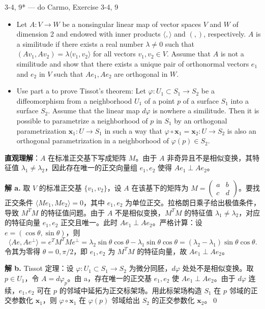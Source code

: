 \begin{exercise}{3-4, 9* — do Carmo, Exercise 3-4, 9}
\begin{itemize}
\item[a.] Let $A \colon V \to W$ be a nonsingular linear map of vector spaces $V$ and $W$ of dimension 2 and endowed with inner products $\langle , \rangle$ and $(, )$, respectively. $A$ is a similitude if there exists a real number $\lambda \neq 0$ such that $(Av_1, Av_2) = \lambda \langle v_1, v_2 \rangle$ for all vectors $v_1, v_2 \in V$. Assume that $A$ is not a similitude and show that there exists a unique pair of orthonormal vectors $e_1$ and $e_2$ in $V$ such that $Ae_1, Ae_2$ are orthogonal in $W$.
\item[b.] Use part a to prove Tissot's theorem: Let $\varphi \colon U_1 \subset S_1 \to S_2$ be a diffeomorphism from a neighborhood $U_1$ of a point $p$ of a surface $S_1$ into a surface $S_2$. Assume that the linear map $d\varphi$ is nowhere a similitude. Then it is possible to parametrize a neighborhood of $p$ in $S_1$ by an orthogonal parametrization $\mathbf{x}_1 \colon U \to S_1$ in such a way that $\varphi \circ \mathbf{x}_1 = \mathbf{x}_2 \colon U \to S_2$ is also an orthogonal parametrization in a neighborhood of $\varphi(p) \in S_2$.
\end{itemize}
\end{exercise}
\begin{solution}
\textbf{直观理解}：$A$ 在标准正交基下写成矩阵 $M$。由于 $A$ 非奇异且不是相似变换，其特征值 $\lambda_1 \neq \lambda_2$，因此存在唯一的正交向量组 $e_1,e_2$ 使得 $Ae_1\perp Ae_2$。

\textbf{解 a.} 取 $V$ 的标准正交基 $\{v_1,v_2\}$，设 $A$ 在该基下的矩阵为 $M = \begin{pmatrix} a & b \\ c & d \end{pmatrix}$。要找正交条件 $\langle Me_1,Me_2\rangle = 0$，其中 $e_1,e_2$ 为单位正交。拉格朗日乘子给出极值条件，导致 $M^TM$ 的特征值问题。由于 $A$ 不是相似变换，$M^TM$ 的特征值 $\lambda_1 \neq \lambda_2$，对应的特征向量 $e_1,e_2$ 正交且唯一。此时 $Ae_1\perp Ae_2$。严格计算：设 $e = (\cos\theta,\sin\theta)$，则
\[
\langle Ae, A e^\perp\rangle = e^TM^TM e^\perp = \lambda_2\sin\theta\cos\theta - \lambda_1\sin\theta\cos\theta = (\lambda_2-\lambda_1)\sin\theta\cos\theta.
\]
令其为零得 $\theta = 0,\pi/2$，即 $e_1,e_2$ 为 $M^TM$ 的特征向量，故 $Ae_1\perp Ae_2$。

\textbf{解 b.} Tissot 定理：设 $\varphi \colon U_1\subset S_1\to S_2$ 为微分同胚，$d\varphi$ 处处不是相似变换。取 $p\in U_1$，令 $A = d\varphi_p$。由 a，存在唯一的正交基 $e_1,e_2$ 使 $Ae_1\perp Ae_2$。由于 $d\varphi$ 连续，$e_1,e_2$ 可在 $p$ 的邻域中延拓为正交标架场。用此标架场构造 $S_1$ 在 $p$ 邻域的正交参数化 $\mathbf{x}_1$，则 $\varphi\circ\mathbf{x}_1$ 在 $\varphi(p)$ 邻域给出 $S_2$ 的正交参数化 $\mathbf{x}_2$。\qed
\end{solution}

